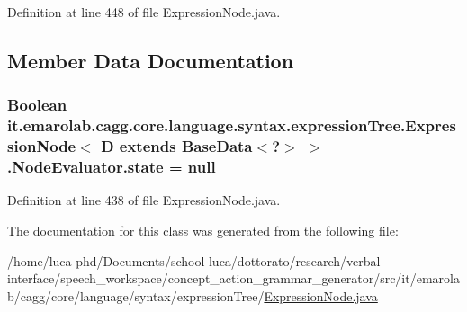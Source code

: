Definition at line 448 of file Expression\-Node.\-java.



\subsection{Member Data Documentation}
\hypertarget{classit_1_1emarolab_1_1cagg_1_1core_1_1language_1_1syntax_1_1expressionTree_1_1ExpressionNode_3_0aba337608b0c3862b39683f89fe93b2_addce53c4ce8e5cf9d554c63da2fccd8c}{
\subsubsection[{state}]{\setlength{\rightskip}{0pt plus 5cm}Boolean it.\-emarolab.\-cagg.\-core.\-language.\-syntax.\-expression\-Tree.\-Expression\-Node$<$ D extends Base\-Data$<$?$>$ $>$.Node\-Evaluator.\-state = null\hspace{0.3cm}{\ttfamily [private]}}}\label{classit_1_1emarolab_1_1cagg_1_1core_1_1language_1_1syntax_1_1expressionTree_1_1ExpressionNode_3_0aba337608b0c3862b39683f89fe93b2_addce53c4ce8e5cf9d554c63da2fccd8c}


Definition at line 438 of file Expression\-Node.\-java.



The documentation for this class was generated from the following file\-:\begin{DoxyCompactItemize}
\item 
/home/luca-\/phd/\-Documents/school luca/dottorato/research/verbal interface/speech\-\_\-workspace/concept\-\_\-action\-\_\-grammar\-\_\-generator/src/it/emarolab/cagg/core/language/syntax/expression\-Tree/\hyperlink{ExpressionNode_8java}{Expression\-Node.\-java}\end{DoxyCompactItemize}
